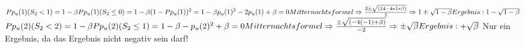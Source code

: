 \documentclass{article}
\begin{document}

$P{p_u(1)}(S_2<1) = 1-\beta\\\\
P{p_u(1)}(S_2\leq 0) = 1-\beta\\\\
(1-P{p_u(1)})^2= 1-\beta\\\\
p_u(1)^2 - 2p_u(1) +\beta= 0\\\\
Mitternachtsformel\Rightarrow \frac{2\pm\sqrt{(14-4*1*\beta)}}{2}\\\\
\Rightarrow 1\pm \sqrt{1-\beta}\\\\
Ergebnis: 1- \sqrt{1-\beta}\\\\
$
$P{p_u(2)}(S_2<2) = 1-\beta\\\\
P{p_u(2)}(S_2\leq 1) = 1-\beta\\\\
-p_u(2)^2 +\beta= 0\\\\
Mitternachtsformel \Rightarrow \frac{\pm\sqrt{(-4(-1)+\beta)}}{-2}\\\\
\Rightarrow \pm \sqrt{\beta}\\\\
Ergebnis: + \sqrt{\beta}\\$ 
Nur ein Ergebnis, da das Ergebnis nicht negativ sein darf!
\end{document}
